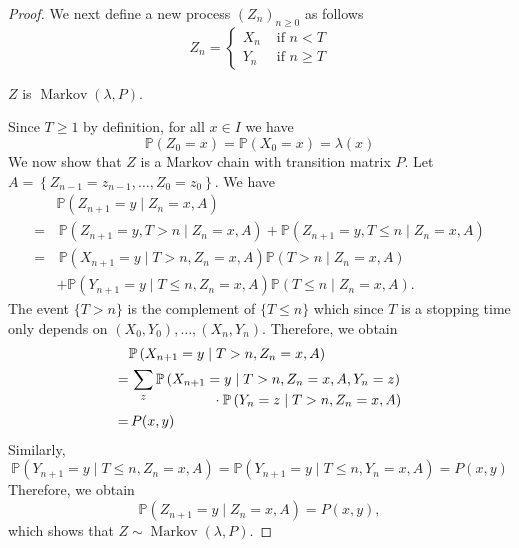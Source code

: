 \documentclass[a4paper,11pt]{article}
\begin{document}
\begin{proof}
    We next define a new process $\left(Z_n\right)_{n \geq 0}$ as follows
    \[
    Z_n= \begin{cases}X_n & \text { if } n<T \\ Y_n & \text { if } n \geq T\end{cases}
    \]
    \begin{claim}
        $Z$ is $\operatorname{Markov}(\lambda, P)$.
    \end{claim}
    Since $T \geq 1$ by definition, for all $x \in I$ we have
    \[
    \mathbb{P}\left(Z_0=x\right)=\mathbb{P}\left(X_0=x\right)=\lambda(x)
    \]
    We now show that $Z$ is a Markov chain with transition matrix $P$. Let $A=\left\{Z_{n-1}=z_{n-1}, \ldots, Z_0=z_0\right\}$. We have
    \[
    \begin{aligned}
    &\mathbb{P}\left(Z_{n+1}=y \mid Z_n=x, A\right)\\=&\, \mathbb{P}\left(Z_{n+1}=y, T>n \mid Z_n=x, A\right)+\mathbb{P}\left(Z_{n+1}=y, T \leq n \mid Z_n=x, A\right) \\
    =&\, \mathbb{P}\left(X_{n+1}=y \mid T>n, Z_n=x, A\right) \mathbb{P}\left(T>n \mid Z_n=x, A\right) \\
    &+\mathbb{P}\left(Y_{n+1}=y \mid T \leq n, Z_n=x, A\right) \mathbb{P}\left(T \leq n \mid Z_n=x, A\right) .
    \end{aligned}
    \]
    The event $\{T>n\}$ is the complement of $\{T \leq n\}$ which since $T$ is a stopping time only depends on $\left(X_0, Y_0\right), \ldots,\left(X_n, Y_n\right)$. Therefore, we obtain
    \begin{align*}
        & \mathbb{P}\left(X_{n+1}
        =y \mid T>n, Z_n=x, A\right)\\ 
    =&\, \sum_z \mathbb{P}\left(X_{n+1}=y \mid T>n, Z_n=x, A, Y_n=z\right) \\[-1em]
    &\hspace*{6em}\cdot \mathbb{P}\left(Y_n=z \mid T>n, Z_n=x, A\right)\\ 
    =&\, P(x, y)
    \end{align*}
    Similarly,
    \[
    \mathbb{P}\left(Y_{n+1}=y \mid T \leq n, Z_n=x, A\right)=\mathbb{P}\left(Y_{n+1}=y \mid T \leq n, Y_n=x, A\right)=P(x, y)
    \]
    Therefore, we obtain
    \[
    \mathbb{P}\left(Z_{n+1}=y \mid Z_n=x, A\right)=P(x, y),
    \]
    which shows that $Z \sim \operatorname{Markov}(\lambda, P)$.


\end{proof}
\end{document}
